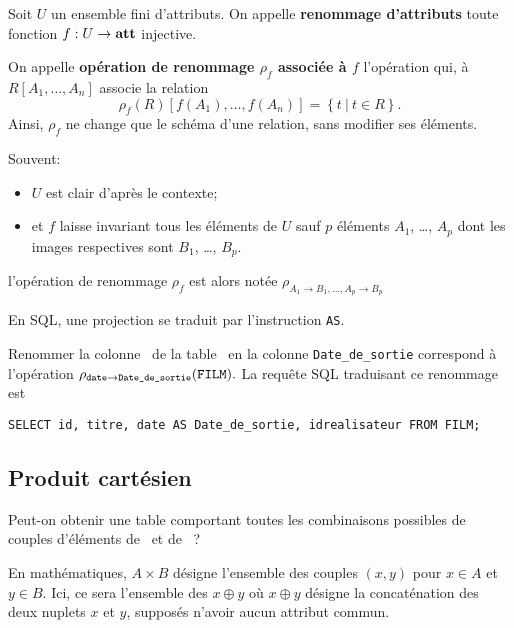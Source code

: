 \begin{defi}[Renommage]
  Soit $U$ un ensemble fini d'attributs.  On appelle \textbf{renommage d'attributs} toute fonction $f : U\to \mathbf{att}$
  injective.

  On appelle \textbf{opération de renommage $\rho_{f}$ associée à $f$}
  l'opération qui, à $R[A_1,\dots,A_n]$ associe la relation 
  \begin{equation*}
    \rho_{f}(R)[f(A_1),\dots,f(A_n)]=\left\{ t ~|~ t \in R\right\}.
  \end{equation*}
  Ainsi, $\rho_f$ ne change que le schéma d'une relation, sans modifier ses éléments. 

  Souvent:
  \begin{itemize}
  \item  $U$ est clair d'après le contexte;
  \item et $f$ laisse invariant tous les éléments de $U$ sauf $p$
    éléments $A_{1}$, \ldots{}, $A_{p}$ dont les images respectives
    sont $B_{1}$, \ldots{}, $B_{p}$.
  \end{itemize}
  l'opération de renommage $\rho_{f}$ est alors notée
  $\rho_{A_{1}\rightarrow B_{1},\ldots,A_{p}\rightarrow B_{p}}$
\end{defi}

En SQL, une projection se traduit par l'instruction \texttt{AS}.
\begin{exemple}
  Renommer la colonne \ttdate\ de la table \FILM\ en la colonne \texttt{Date\_de\_sortie} correspond à l'opération 
$
    \rho_{\mathtt{date} \rightarrow \texttt{Date\_de\_sortie}} (\mathtt{FILM}).
  $
La requête SQL traduisant ce renommage est 

\texttt{SELECT id, titre, date AS Date\_de\_sortie, idrealisateur FROM FILM;}

\end{exemple}


\subsection{Produit cartésien}

Peut-on obtenir une table comportant toutes les combinaisons possibles de couples d'éléments de \PERSONNE\ et de \JOUE\ ?

\begin{rem} 
  En mathématiques, $A\times B$ désigne l'ensemble des couples $(x,y)$
pour $x\in A$ et $y\in B$. Ici, ce sera l'ensemble des $x\oplus y$ où
$x\oplus y$ désigne la concaténation des deux nuplets $x$ et $y$,
supposés n'avoir aucun attribut commun.
\end{rem}


